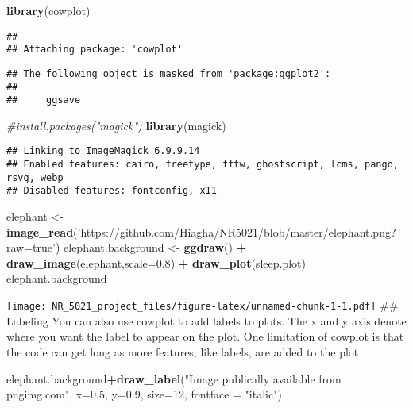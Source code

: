\documentclass[]{article}
\newenvironment{Shaded}{\begin{snugshade}}{\end{snugshade}}
\newcommand{\KeywordTok}[1]{\textcolor[rgb]{0.13,0.29,0.53}{\textbf{#1}}}
\newcommand{\DataTypeTok}[1]{\textcolor[rgb]{0.13,0.29,0.53}{#1}}
\newcommand{\DecValTok}[1]{\textcolor[rgb]{0.00,0.00,0.81}{#1}}
\newcommand{\FloatTok}[1]{\textcolor[rgb]{0.00,0.00,0.81}{#1}}
\newcommand{\StringTok}[1]{\textcolor[rgb]{0.31,0.60,0.02}{#1}}
\newcommand{\CommentTok}[1]{\textcolor[rgb]{0.56,0.35,0.01}{\textit{#1}}}
\newcommand{\OperatorTok}[1]{\textcolor[rgb]{0.81,0.36,0.00}{\textbf{#1}}}
\newcommand{\NormalTok}[1]{#1}
\begin{document}
\begin{Shaded}
\begin{Highlighting}[]
\KeywordTok{library}\NormalTok{(cowplot)}
\end{Highlighting}
\end{Shaded}

\begin{verbatim}
## 
## Attaching package: 'cowplot'
\end{verbatim}

\begin{verbatim}
## The following object is masked from 'package:ggplot2':
## 
##     ggsave
\end{verbatim}

\begin{Shaded}
\begin{Highlighting}[]
\CommentTok{#install.packages("magick")}
\KeywordTok{library}\NormalTok{(magick)}
\end{Highlighting}
\end{Shaded}

\begin{verbatim}
## Linking to ImageMagick 6.9.9.14
## Enabled features: cairo, freetype, fftw, ghostscript, lcms, pango, rsvg, webp
## Disabled features: fontconfig, x11
\end{verbatim}

\begin{Shaded}
\begin{Highlighting}[]
\NormalTok{elephant <-}\StringTok{ }\KeywordTok{image_read}\NormalTok{(}\StringTok{'https://github.com/Hiagha/NR5021/blob/master/elephant.png?raw=true'}\NormalTok{)}
\NormalTok{elephant.background <-}\StringTok{ }\KeywordTok{ggdraw}\NormalTok{() }\OperatorTok{+}\StringTok{ }\KeywordTok{draw_image}\NormalTok{(elephant,}\DataTypeTok{scale=}\FloatTok{0.8}\NormalTok{) }\OperatorTok{+}\StringTok{ }\KeywordTok{draw_plot}\NormalTok{(sleep.plot)}
\NormalTok{elephant.background}
\end{Highlighting}
\end{Shaded}

\texttt{[image: NR\_5021\_project\_files/figure-latex/unnamed-chunk-1-1.pdf]}
\#\# Labeling You can also use cowplot to add labels to plots. The x and
y axis denote where you want the label to appear on the plot. One
limitation of cowplot is that the code can get long as more features,
like labels, are added to the plot

\begin{Shaded}
\begin{Highlighting}[]
\NormalTok{elephant.background}\OperatorTok{+}\KeywordTok{draw_label}\NormalTok{(}\StringTok{"Image publically available from pngimg.com"}\NormalTok{, }\DataTypeTok{x=}\FloatTok{0.5}\NormalTok{, }\DataTypeTok{y=}\FloatTok{0.9}\NormalTok{, }\DataTypeTok{size=}\DecValTok{12}\NormalTok{, }\DataTypeTok{fontface =} \StringTok{"italic"}\NormalTok{)}
\end{Highlighting}
\end{Shaded}
\end{document}
